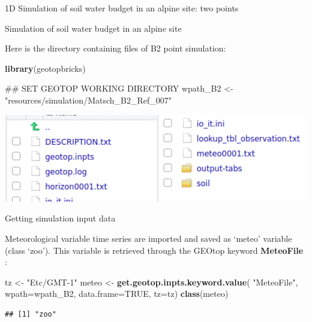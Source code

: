 \documentclass[ignorenonframetext,]{beamer}
\newenvironment{Shaded}{\begin{snugshade}}{\end{snugshade}}
\newcommand{\KeywordTok}[1]{\textcolor[rgb]{0.13,0.29,0.53}{\textbf{#1}}}
\newcommand{\DataTypeTok}[1]{\textcolor[rgb]{0.13,0.29,0.53}{#1}}
\newcommand{\StringTok}[1]{\textcolor[rgb]{0.31,0.60,0.02}{#1}}
\newcommand{\OtherTok}[1]{\textcolor[rgb]{0.56,0.35,0.01}{#1}}
\newcommand{\NormalTok}[1]{#1}
\begin{document}
\begin{frame}{1D Simulation of soil water budget in an alpine site: two
points}
\end{frame}

\begin{frame}[fragile]{Simulation of soil water budget in an alpine
site}

Here is the directory containing files of B2 point simulation:

\begin{Shaded}
\begin{Highlighting}[]
\KeywordTok{library}\NormalTok{(geotopbricks) }

\NormalTok{## SET GEOTOP WORKING DIRECTORY}
\NormalTok{wpath_B2 <-}\StringTok{ "resources/simulation/Matsch_B2_Ref_007"} 
\end{Highlighting}
\end{Shaded}

\includegraphics[width=1.00000\textwidth]{resources/images/geotop_folder_B2.png}\\

\end{frame}

\begin{frame}[fragile]{Getting simulation input data}

Meteorological variable time series are imported and saved as `meteo'
variable (class `zoo'). This variable is retrieved through the GEOtop
keyword \textbf{MeteoFile} :

\begin{Shaded}
\begin{Highlighting}[]
\NormalTok{tz <-}\StringTok{ "Etc/GMT-1"}
\NormalTok{meteo <-}\StringTok{ }\KeywordTok{get.geotop.inpts.keyword.value}\NormalTok{(}
  \StringTok{"MeteoFile"}\NormalTok{,}
  \DataTypeTok{wpath=}\NormalTok{wpath_B2,}
  \DataTypeTok{data.frame=}\OtherTok{TRUE}\NormalTok{,}
  \DataTypeTok{tz=}\NormalTok{tz)}
\KeywordTok{class}\NormalTok{(meteo)}
\end{Highlighting}
\end{Shaded}

\begin{verbatim}
## [1] "zoo"
\end{verbatim}

\end{frame}
\end{document}
